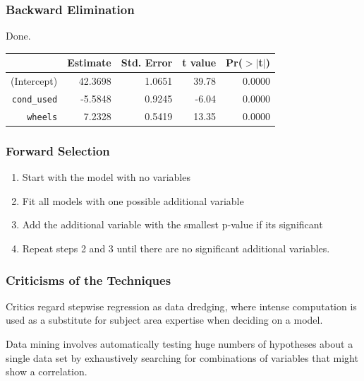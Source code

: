 \documentclass[handout]{beamer}
\newcommand{\blue}[1]{\textcolor{blue2}{#1}}
\begin{document}
\begin{frame}[fragile]
\frametitle{Backward Elimination}
Done.

\begin{table}[ht]
\centering
\begin{tabular}{rrrrr}
  \hline
 & Estimate & Std. Error & t value & Pr($>$$|$t$|$) \\ 
  \hline
(Intercept) & 42.3698 & 1.0651 & 39.78 & 0.0000 \\ 
  {\tt cond\_used} & -5.5848 & 0.9245 & -6.04 & 0.0000 \\ 
  {\tt wheels} & 7.2328 & 0.5419 & 13.35 & 0.0000 \\ 
   \hline
\end{tabular}
\end{table}
 

\end{frame}


\begin{frame}[fragile]
\frametitle{Forward Selection}

\begin{enumerate}
\item Start with the model with no variables
\pause\item Fit all models with one possible additional variable
\pause\item Add the additional variable with the smallest p-value if its significant
\pause\item Repeat steps 2 and 3 until there are no significant additional variables.  
\end{enumerate}

\end{frame}



\begin{frame}[fragile]
\frametitle{Criticisms of the Techniques}

Critics regard stepwise regression as \blue{data dredging}, where intense computation is used as a substitute for subject area expertise when deciding on a model.  

\pause
\vspace{0.5cm}

\blue{Data mining} involves automatically testing huge numbers of hypotheses about a single data set by exhaustively searching for combinations of variables that might show a correlation.

\end{frame}
\end{document}
